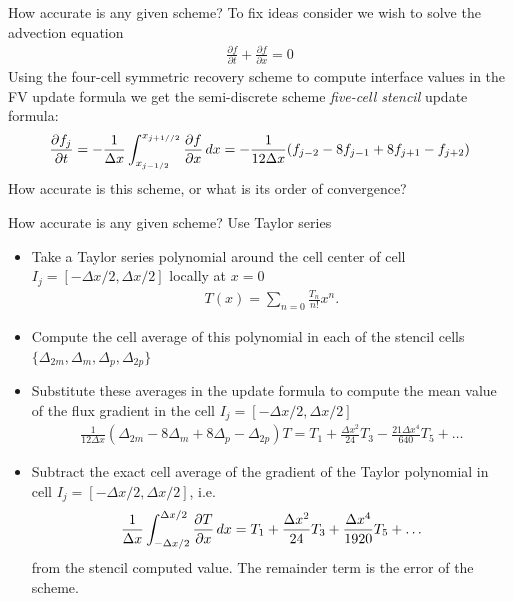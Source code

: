 \documentclass[aspectratio=169]{beamer}
\newcommand{\mypause}{}
\newcommand{\pfrac}[2]{\frac{\partial #1}{\partial #2}}
\newcommand{\cramplist}{
	\setlength{\itemsep}{0in}
	\setlength{\partopsep}{0in}
	\setlength{\topsep}{0in}}
\begin{document}
\begin{frame}{How accurate is any given scheme?}
  To fix ideas consider we wish to solve the advection equation
  \begin{align*}
    \pfrac{f}{t} + \pfrac{f}{x} = 0
  \end{align*}
  Using the four-cell symmetric recovery scheme to compute interface
  values in the FV update formula we get the semi-discrete scheme
  \emph{five-cell stencil} update formula:
  \begin{align*}
    \pfrac{f_j}{t}
    = -\frac{1}{\Delta x}\int_{x_{j-1/2}}^{x_{j+1//2}}
    \pfrac{f}{x} \thinspace dx
    =
    -\frac{1}{12 \Delta x} (f_{j-2} - 8f_{j-1} + 8 f_{j+1} - f_{j+2})
  \end{align*}
  How accurate is this scheme, or what is its order of convergence?
\end{frame}

\begin{frame}{How accurate is any given scheme? Use Taylor series}
  \footnotesize%
  \begin{itemize}\cramplist
  \item Take a Taylor series polynomial around the cell center of cell
    $I_j = [-\Delta x/2, \Delta x/2]$ locally at $x=0$
    \begin{align*}
      T(x) = \sum_{n=0} \frac{T_n}{n!} x^n.
    \end{align*}
    \mypause%
  \item Compute the cell average of this polynomial in each of the
    stencil cells $\{\Delta_{2m}, \Delta_m, \Delta_p, \Delta_{2p} \}$
    \mypause%
  \item Substitute these averages in the update formula to compute the
    mean value of the flux gradient in the cell
    $I_j = [-\Delta x/2, \Delta x/2]$
    \begin{align*}
      \frac{1}{12 \Delta x} (\Delta_{2m} - 8\Delta_m + 8 \Delta_p -
      \Delta_{2p}) T
      =
      T_1 + \frac{\Delta x^2}{24} T_3  - \frac{21 \Delta x^4}{640} T_5 + \ldots
    \end{align*}
    \mypause%
  \item Subtract the exact cell average of the gradient of the Taylor
    polynomial in cell $I_j = [-\Delta x/2, \Delta x/2]$, i.e.
    \begin{align*}
      \frac{1}{\Delta x}\int_{-\Delta x/2}^{\Delta x/2} \pfrac{T}{x} \thinspace dx
      =
      T_1 + \frac{\Delta x^2}{24} T_3  + \frac{\Delta x^4}{1920} T_5 + \ldots
    \end{align*}
    from the stencil computed value. The remainder term is the error
    of the scheme.
  \end{itemize}  
\end{frame}
\end{document}
